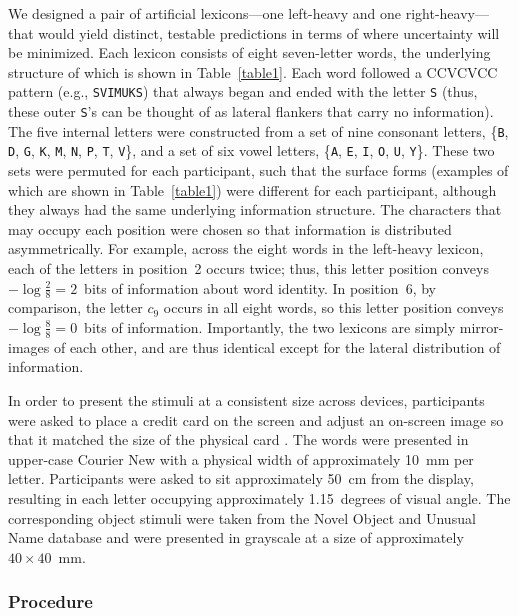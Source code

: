 \documentclass[doc,biblatex,floatsintext]{apa7}
\begin{document}
We designed a pair of artificial lexicons---one left-heavy and one right-heavy---that would yield distinct, testable predictions in terms of where uncertainty will be minimized. Each lexicon consists of eight seven-letter words, the underlying structure of which is shown in Table~\ref{table1}. Each word followed a CCVCVCC pattern (e.g., \texttt{SVIMUKS}) that always began and ended with the letter \texttt{S} (thus, these outer \texttt{S}'s can be thought of as lateral flankers that carry no information). The five internal letters were constructed from a set of nine consonant letters, \{\texttt{B}, \texttt{D}, \texttt{G}, \texttt{K}, \texttt{M}, \texttt{N}, \texttt{P}, \texttt{T}, \texttt{V}\}, and a set of six vowel letters, \{\texttt{A}, \texttt{E}, \texttt{I}, \texttt{O}, \texttt{U}, \texttt{Y}\}. These two sets were permuted for each participant, such that the surface forms (examples of which are shown in Table~\ref{table1}) were different for each participant, although they always had the same underlying information structure. The characters that may occupy each position were chosen so that information is distributed asymmetrically. For example, across the eight words in the left-heavy lexicon, each of the letters in position~2 occurs twice; thus, this letter position conveys $-\log \frac{2}{8} = 2$~bits of information about word identity. In position~6, by comparison, the letter $c_9$ occurs in all eight words, so this letter position conveys $-\log \frac{8}{8} = 0$~bits of information. Importantly, the two lexicons are simply mirror-images of each other, and are thus identical except for the lateral distribution of information.

In order to present the stimuli at a consistent size across devices, participants were asked to place a credit card on the screen and adjust an on-screen image so that it matched the size of the physical card \parencite{Li:2020}. The words were presented in upper-case Courier New with a physical width of approximately 10~mm per letter. Participants were asked to sit approximately 50~cm from the display, resulting in each letter occupying approximately 1.15~degrees of visual angle. The corresponding object stimuli were taken from the Novel Object and Unusual Name database \parencite{Horst:2016} and were presented in grayscale at a size of approximately $40 \times 40$~mm.

\subsubsection{Procedure}
\end{document}
